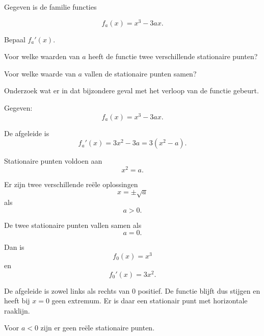 \documentclass{ximera}
\begin{document}

\begin{oefening}{\oefG}

Gegeven is de familie functies

\[
f_a(x)=x^3-3ax.
\]

\begin{question}
Bepaal $f_a'(x)$.
\end{question}

\begin{question}
Voor welke waarden van $a$ heeft de functie twee verschillende
stationaire punten?
\end{question}

\begin{question}
Voor welke waarde van $a$ vallen de stationaire punten samen?
\end{question}

\begin{question}
Onderzoek wat er in dat bijzondere geval met het verloop van de
functie gebeurt.
\end{question}

\begin{oplossing}

Gegeven:
\[
f_a(x)=x^3-3ax.
\]

De afgeleide is
\[
f_a'(x)=3x^2-3a
=3(x^2-a).
\]

Stationaire punten voldoen aan
\[
x^2=a.
\]

Er zijn twee verschillende reële oplossingen
\[
x=\pm\sqrt a
\]
als
\[
\boxed{a>0}.
\]

De twee stationaire punten vallen samen als
\[
\boxed{a=0}.
\]

Dan is
\[
f_0(x)=x^3
\]
en
\[
f_0'(x)=3x^2.
\]

De afgeleide is zowel links als rechts van $0$ positief. De functie blijft
dus stijgen en heeft bij $x=0$ geen extremum. Er is daar een stationair punt
met horizontale raaklijn.

Voor $a<0$ zijn er geen reële stationaire punten.

\end{oplossing}

\end{oefening}


\end{document}
